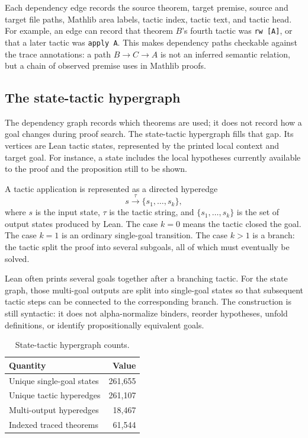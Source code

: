 \documentclass[11pt]{article}
\begin{document}
Each dependency edge records the source theorem, target premise, source and
target file paths, Mathlib area labels, tactic index, tactic text, and tactic
head. For example, an edge can record that theorem $B$'s fourth tactic was
\texttt{rw [A]}, or that a later tactic was \texttt{apply A}. This makes
dependency paths checkable against the trace annotations: a path $B \to C \to
A$ is not an inferred semantic relation, but a chain of observed premise uses
in Mathlib proofs.

\subsection{The state-tactic hypergraph}

The dependency graph records which theorems are used; it does not record how a
goal changes during proof search. The state-tactic hypergraph fills that gap.
Its vertices are Lean tactic states, represented by the printed local context
and target goal. For instance, a state includes the local hypotheses currently
available to the proof and the proposition still to be shown.

A tactic application is represented as a directed hyperedge
\[
s \xrightarrow{\tau} \{s_1,\ldots,s_k\},
\]
where $s$ is the input state, $\tau$ is the tactic string, and
$\{s_1,\ldots,s_k\}$ is the set of output states produced by Lean. The case
$k=0$ means the tactic closed the goal. The case $k=1$ is an ordinary
single-goal transition. The case $k>1$ is a branch: the tactic split the proof
into several subgoals, all of which must eventually be solved.

Lean often prints several goals together after a branching tactic. For the
state graph, those multi-goal outputs are split into single-goal states so that
subsequent tactic steps can be connected to the corresponding branch. The
construction is still syntactic: it does not alpha-normalize binders, reorder
hypotheses, unfold definitions, or identify propositionally equivalent goals.

\begin{table}[h]
\centering
\begin{tabular}{lr}
\toprule
Quantity & Value \\
\midrule
Unique single-goal states & 261,655 \\
Unique tactic hyperedges & 261,107 \\
Multi-output hyperedges & 18,467 \\
Indexed traced theorems & 61,544 \\
\bottomrule
\end{tabular}
\caption{State-tactic hypergraph counts.}
\end{table}
\end{document}
